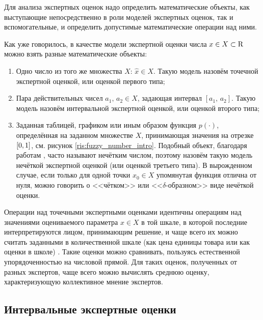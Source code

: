 
\label{sec:math_methods_global}

Для анализа экспертных оценок надо определить математические объекты, как выступающие непосредственно в роли моделей экспертных оценок, так и вспомогательные, и определить допустимые математические операции над ними. 

Как уже говорилось, в качестве модели экспертной оценки числа $x \in X \subset {\mathrm{R}}$ можно взять разные математические объекты: %
\begin{enumerate}
  \item Одно число из того же множества $X$: $\hat{x} \in X$. Такую модель назовём точечной экспертной оценкой, или оценкой первого типа;
  \item Пара действительных чисел $a_1,\, a_2 \in X$, задающая интервал $[a_1,\, a_2]$. Такую модель назовём интервальной экспертной оценкой, или оценкой второго типа;
  \item Заданная таблицей, графиком или иным образом функция $p(\cdot)$, определённая на заданном множестве $X$, принимающая значения на отрезке $[0,1]$, см. рисунок \ref{ris:fuzzy_number_intro}.  Подобный объект, благодаря работам \cite{citeZadeh, dubois_prade-1990}, часто называют нечётким числом, поэтому назовём такую модель нечёткой экспертной оценкой (или оценкой третьего типа). В вырожденном случае, если только для одной точки $x_0 \in X$ упомянутая функция отлична от нуля, можно говорить о <<чётком>> или <<$\delta$-образном>> виде нечёткой оценки.
\end{enumerate}

Операции над точечными экспертными оценками идентичны операциям над значениями оцениваемого параметра  $x \in X$  в той шкале, в которой последние интерпретируются лицом, принимающим решение, и чаще всего их можно считать заданными в количественной шкале (как цена единицы товара или как оценки в школе) \cite{Mirkin}. Такие оценки можно сравнивать, пользуясь естественной упорядоченностью на числовой прямой. Для таких оценок, полученных от разных экспертов, чаще всего можно вычислять среднюю оценку, характеризующую коллективное мнение экспертов. 

\subsection{Интервальные экспертные оценки}

